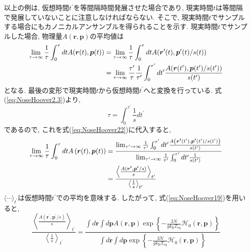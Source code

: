 以上の例は, 仮想時間$t^{\prime}$を等間隔時間発展させた場合であり, 現実時間$t$は等間隔で発展していないことに注意しなければならない.
そこで, 現実時間$t$でサンプルする場合にもカノニカルアンサンブルを得られることを示す.
現実時間$t$でサンプルした場合, 物理量$A(\bm{r}, \bm{p})$の平均値は
\begin{align}
 \lim_{\tau \to \infty} \frac{1}{\tau}
 \int_{0}^{\tau} dt A(\bm{r}(t), \bm{p}(t))
 &=
 \lim_{\tau \to \infty} \frac{1}{\tau}
 \int_{0}^{\tau} dt A(\bm{r}^{\prime}(t), \bm{p}^{\prime}(t)/s(t) )
 \notag
 \\
 &=
 \lim_{\tau \to \infty} \frac{\tau^{\prime}}{\tau} \frac{1}{\tau^{\prime}}
 \int_{0}^{\tau^{\prime}} dt^{\prime}
 \frac{A(\bm{r}(t^{\prime}), \bm{p}(t^{\prime})/s(t^{\prime})) }
      {s(t^{\prime})}
 \label{eq:NoseHoover22}
\end{align}
となる. 最後の変形で現実時間$t$から仮想時間$t^{\prime}$へと変換を行っている.
式(\ref{eq:NoseHoover2.3})より,
\begin{equation}
 \tau = \int_{0}^{\tau^{\prime}} \frac{1}{s} d t^{\prime}
 \label{eq:NoseHoover23}
\end{equation}
であるので, これを式(\ref{eq:NoseHoover22})に代入すると,
\begin{align}
 \lim_{\tau \to \infty} \frac{1}{\tau}
 \int_{0}^{\tau} dt A \left(\bm{r}(t), \bm{p}(t)\right)
 &=
 \frac{
 \lim_{\tau^{\prime} \to \infty} \frac{1}{\tau^{\prime}}
 \int_{0}^{\tau^{\prime}} dt^{\prime}
 \frac{A \left( \bm{r^{\prime}}(t^{\prime}), \bm{p^{\prime}}(t^{\prime})/s(t^{\prime}) \right)}
 {s(t^{\prime})}
 }
 {
 \lim_{\tau^{\prime} \to \infty} \frac{1}{\tau^{\prime}}
 \int_{0}^{\tau^{\prime}} dt^{\prime} \frac{1}{s(t^{\prime})}
 }
 \notag
 \\
 &=
  \frac{
  \left\langle \frac{A ( \bm{r^{\prime}}, \bm{p^{\prime}}/s )}
               {s} \right\rangle_{t^{\prime}}
  }
  {
  \left\langle \frac{1}{s} \right\rangle_{t^{\prime}}
 }
 \label{eq:NoseHoover24}
\end{align}
$\langle \cdots \rangle_{t^{\prime}}$は仮想時間$t^{\prime}$での平均を意味する.
したがって, 式(\ref{eq:NoseHoover19})を用いると,
\begin{equation}
 \frac{
  \left\langle \frac{A ( \bm{r^{\prime}}, \bm{p^{\prime}}/s )}
               {s} \right\rangle_{t^{\prime}}
  }
  {
  \left\langle \frac{1}{s} \right\rangle_{t^{\prime}}
 }
 =
 \frac{
 \int d\bm{r} \int d\bm{p} A(\bm{r}, \bm{p})
 \exp \left\{ -\frac{3N}{g k_{\mathrm{B}} T_{\mathrm{eq}}}
       \mathcal{H}_{0} (\bm{r},\bm{p})
      \right\}
 }{
 \int d\bm{r} \int d\bm{p}
 \exp \left\{ -\frac{3N}{g k_{\mathrm{B}} T_{\mathrm{eq}}}
       \mathcal{H}_{0} (\bm{r},\bm{p})
      \right\}
 }
 \label{eq:NoseHoover25}
\end{equation}
